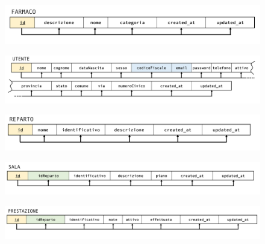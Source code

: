 \documentclass[paper=a4, fontsize=11pt,x11names]{report}
\begin{document}
\begin{figure}
\begin{center}
\includegraphics[scale=0.4]{immagini_normalizzazione/farmaco}
\end{center}
\end{figure}

\begin{figure}[H]
\begin{center}
\includegraphics[scale=0.4]{immagini_normalizzazione/utente}
\end{center}
\end{figure}

\begin{figure}[H]
\begin{center}
\includegraphics[scale=0.4]{immagini_normalizzazione/reparto}
\end{center}
\end{figure}

\begin{figure}[H]
\begin{center}
\includegraphics[scale=0.4]{immagini_normalizzazione/sala}
\end{center}
\end{figure}

\begin{figure}[H]
\begin{center}
\includegraphics[scale=0.4]{immagini_normalizzazione/prestazione}
\end{center}
\end{figure}
\end{document}
